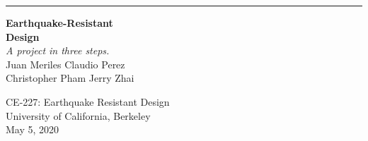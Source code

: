 
\begin{titlepage} %

	\raggedleft %
	
	\rule{1pt}{\textheight} %
	\hspace{0.05\textwidth} %
	\parbox[b]{0.75\textwidth}{ %
		
		{\Huge\bfseries Earthquake-Resistant \\[0.5\baselineskip] Design}\\[2\baselineskip] %
		{\large\textit{ \color{black} A project in three steps.}}\\[4\baselineskip] %

		{Juan Meriles  \space\space\space\space Claudio Perez \\ Christopher Pham  \space\space Jerry Zhai}
		\vspace{0.5\textheight}
		
		{\noindent CE-227: Earthquake Resistant Design}\\ University of California, Berkeley \\ May 5, 2020 \\ [\baselineskip]
		}

\end{titlepage}
